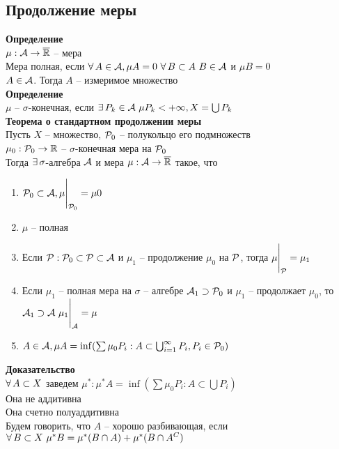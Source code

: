 \documentclass[12pt]{article}
\begin{document}
\subsection{Продолжение меры}
\textbf{Определение}\\
$\mu: \mathcal A \rightarrow \overline{\mathbb{R}}$ -- мера\\
Мера полная, если $\forall\, A \in \mathcal A, \mu A = 0\ \forall\, B \subset A\ B \in \mathcal A$ и $\mu B = 0$\\
$A \in \mathcal{A}$. Тогда $A$ -- измеримое множество\\
\textbf{Определение}\\
$\mu$ -- $\sigma$-конечная, если $\exists\, P_k \in \mathcal A\ \mu P_k < +\infty, X = \bigcup P_k$\\
\textbf{Теорема о стандартном продолжении меры}\\
Пусть $X$ -- множество, $\mathcal P_0$ -- полукольцо его подмножеств\\
$\mu_0: \mathcal P_0  \rightarrow \mathbb{R}$ -- $\sigma$-конечная мера на $\mathcal P_0$\\
Тогда $\exists\, \sigma$-алгебра $\mathcal A$ и мера $\mu: \mathcal A \rightarrow \overline{\mathbb{R}}$ такое, что 
\begin{enumerate}
    \item $\mathcal P_0 \subset \mathcal A, \mu \Biggr|_{\mathcal P_0} = \mu 0$
    \item $\mu$ -- полная
    \item Если $\mathcal P: \mathcal P_0 \subset \mathcal P \subset \mathcal A$ и $\mu_1$ -- продолжение $\mu_0$ на $\mathcal P$, тогда $\mu\Biggr|_{\mathcal P} = \mu_1$
    \item Если $\mu_1$ -- полная мера на $\sigma$ -- алгебре $\mathcal A_1 \supset \mathcal P_0$ и $\mu_1$ -- продолжает $\mu_0$, то $\mathcal A_1 \supset \mathcal A\ \mu_1 \Biggr|_\mathcal{A} = \mu$
    \item $A \in \mathcal A, \mu A = \inf(\sum \mu_0 P_i: A \subset \bigcup_{i=1}^\infty P_i, P_i \in \mathcal P_0)$
\end{enumerate}
\textbf{Доказательство}\\
$\forall\, A \subset X$ заведем $\mu^*: \mu^* A = \inf (\sum \mu_0 P_i: A \subset \bigcup P_i)$\\
Она не аддитивна\\
Она счетно полуаддитивна\\
Будем говорить, что $A$ -- хорошо разбивающая, если $\fall B\subset X\ \mu^* B = \mu^*(B \cap A) + \mu^*(B \cap A^C)$\\
\end{document}
